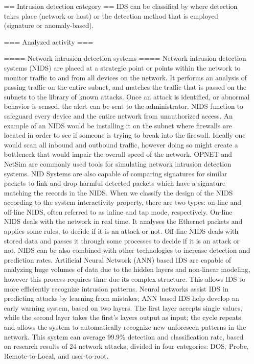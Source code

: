 == Intrusion detection category ==
IDS can be classified by where detection takes place (network or host) or the detection method that is employed (signature or anomaly-based).


=== Analyzed activity ===


==== Network intrusion detection systems ====
Network intrusion detection systems (NIDS) are placed at a strategic point or points within the network to monitor traffic to and from all devices on the network. It performs an analysis of passing traffic on the entire subnet, and matches the traffic that is passed on the subnets to the library of known attacks. Once an attack is identified, or abnormal behavior is sensed, the alert can be sent to the administrator. NIDS function to safeguard every device and the entire network from unauthorized access.
An example of an NIDS would be installing it on the subnet where firewalls are located in order to see if someone is trying to break into the firewall. Ideally one would scan all inbound and outbound traffic, however doing so might create a bottleneck that would impair the overall speed of the network. OPNET and NetSim are commonly used tools for simulating network intrusion detection systems. NID Systems are also capable of comparing signatures for similar packets to link and drop harmful detected packets which have a signature matching the records in the NIDS. When we classify the design of the NIDS according to the system interactivity property, there are two types: on-line and off-line NIDS, often referred to as inline and tap mode, respectively. On-line NIDS deals with the network in real time. It analyses the Ethernet packets and applies some rules, to decide if it is an attack or not. Off-line NIDS deals with stored data and passes it through some processes to decide if it is an attack or not.
NIDS can be also combined with other technologies to increase detection and prediction rates. Artificial Neural Network (ANN) based IDS are capable of analyzing huge volumes of data due to the hidden layers and non-linear modeling, however this process requires time due its complex structure. This allows IDS to more efficiently recognize intrusion patterns. Neural networks assist IDS in predicting attacks by learning from mistakes; ANN based IDS help develop an early warning system, based on two layers. The first layer accepts single values, while the second layer takes the first's layers output as input; the cycle repeats and allows the system to automatically recognize new unforeseen patterns in the network. This system can average 99.9\% detection and classification rate, based on research results of 24 network attacks, divided in four categories: DOS, Probe, Remote-to-Local, and user-to-root.


